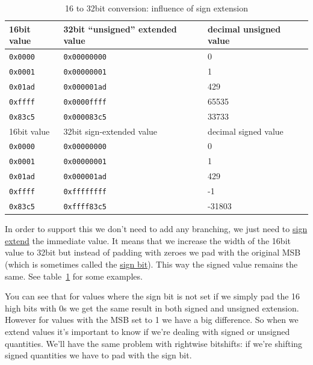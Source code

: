 \documentclass[a4paper]{article}
\newcommand{\code}[1] {\texttt{#1}}
\begin{document}
\begin{table}[ht]
  \centering

  \begin{tabular}{ l | l | l }
    16bit value & 32bit ``unsigned'' extended value & decimal unsigned value \\
    \hline
    \code{0x0000} & \code{0x00000000} & 0     \\
    \code{0x0001} & \code{0x00000001} & 1     \\
    \code{0x01ad} & \code{0x000001ad} & 429   \\
    \code{0xffff} & \code{0x0000ffff} & 65535 \\
    \code{0x83c5} & \code{0x000083c5} & 33733 \\
    \hline
    \hline
    16bit value & 32bit sign-extended value & decimal signed value \\
    \hline
    \code{0x0000} & \code{0x00000000} & 0      \\
    \code{0x0001} & \code{0x00000001} & 1      \\
    \code{0x01ad} & \code{0x000001ad} & 429    \\
    \code{0xffff} & \code{0xffffffff} & -1     \\
    \code{0x83c5} & \code{0xffff83c5} & -31803 \\
  \end{tabular}

  \caption{16 to 32bit conversion: influence of sign extension}
  \label{tab:signextend}
\end{table}

In order to support this we don't need to add any branching, we just
need to \href{https://en.wikipedia.org/wiki/Sign_extension}{sign
  extend} the immediate value. It means that we increase the width of
the 16bit value to 32bit but instead of padding with zeroes we pad
with the original MSB (which is sometimes called the
\href{https://en.wikipedia.org/wiki/Sign_bit}{sign bit}). This way the
signed value remains the same. See table~\ref{tab:signextend} for some
examples.

You can see that for values where the sign bit is not set if we simply
pad the 16 high bits with 0s we get the same result in both signed and
unsigned extension. However for values with the MSB set to 1 we have a
big difference. So when we extend values it's important to know if
we're dealing with signed or unsigned quantities. We'll have the same
problem with rightwise bitshifts: if we're shifting signed quantities
we have to pad with the sign bit.
\end{document}
